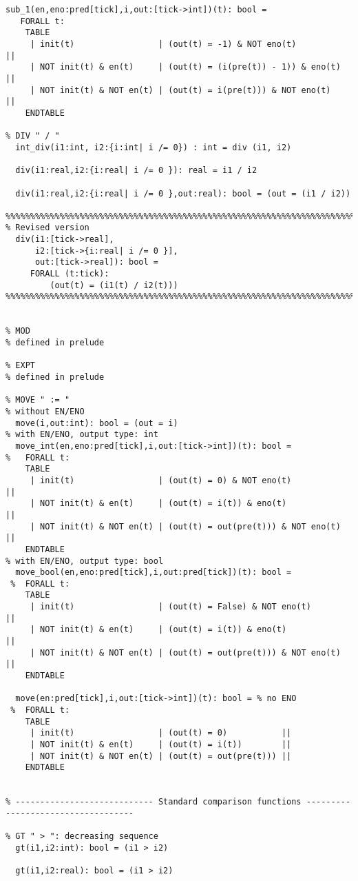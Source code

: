 \begin{singlespace}
\begin{lstlisting}[tabsize=2, language=PVS]
  sub_1(en,eno:pred[tick],i,out:[tick->int])(t): bool = 
   FORALL t:
    TABLE
     | init(t)                 | (out(t) = -1) & NOT eno(t)          || 
     | NOT init(t) & en(t)     | (out(t) = (i(pre(t)) - 1)) & eno(t) ||
     | NOT init(t) & NOT en(t) | (out(t) = i(pre(t))) & NOT eno(t)   ||
    ENDTABLE

% DIV " / "
  int_div(i1:int, i2:{i:int| i /= 0}) : int = div (i1, i2)

  div(i1:real,i2:{i:real| i /= 0 }): real = i1 / i2

  div(i1:real,i2:{i:real| i /= 0 },out:real): bool = (out = (i1 / i2)) 

%%%%%%%%%%%%%%%%%%%%%%%%%%%%%%%%%%%%%%%%%%%%%%%%%%%%%%%%%%%%%%%%%%%%%%%%%
% Revised version
  div(i1:[tick->real],
      i2:[tick->{i:real| i /= 0 }],
      out:[tick->real]): bool =
     FORALL (t:tick):
         (out(t) = (i1(t) / i2(t)))
%%%%%%%%%%%%%%%%%%%%%%%%%%%%%%%%%%%%%%%%%%%%%%%%%%%%%%%%%%%%%%%%%%%%%%%%%


% MOD
% defined in prelude

% EXPT
% defined in prelude

% MOVE " := "
% without EN/ENO 
  move(i,out:int): bool = (out = i)
% with EN/ENO, output type: int
  move_int(en,eno:pred[tick],i,out:[tick->int])(t): bool = 
%   FORALL t:
    TABLE
     | init(t)                 | (out(t) = 0) & NOT eno(t)           || 
     | NOT init(t) & en(t)     | (out(t) = i(t)) & eno(t)            ||
     | NOT init(t) & NOT en(t) | (out(t) = out(pre(t))) & NOT eno(t) ||
    ENDTABLE
% with EN/ENO, output type: bool
  move_bool(en,eno:pred[tick],i,out:pred[tick])(t): bool = 
 %  FORALL t:
    TABLE
     | init(t)                 | (out(t) = False) & NOT eno(t)       || 
     | NOT init(t) & en(t)     | (out(t) = i(t)) & eno(t)            ||
     | NOT init(t) & NOT en(t) | (out(t) = out(pre(t))) & NOT eno(t) ||
    ENDTABLE

  move(en:pred[tick],i,out:[tick->int])(t): bool = % no ENO
 %  FORALL t:
    TABLE
     | init(t)                 | (out(t) = 0)           || 
     | NOT init(t) & en(t)     | (out(t) = i(t))        ||
     | NOT init(t) & NOT en(t) | (out(t) = out(pre(t))) ||
    ENDTABLE


% ---------------------------- Standard comparison functions -----------------------------------

% GT " > ": decreasing sequence
  gt(i1,i2:int): bool = (i1 > i2)

  gt(i1,i2:real): bool = (i1 > i2)


\end{lstlisting}
\end{singlespace}
